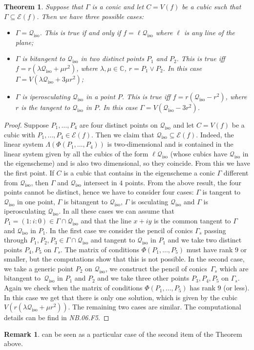 \documentclass[a4paper, 11pt, reqno]{amsart}
\theoremstyle{plain}
\newtheorem{theorem}[lemma]{Theorem}
\theoremstyle{definition}
\newtheorem{rmk}[lemma]{Remark}
\newcommand{\nb}[2]{\textsl{{NB}.{#1}.{#2}}}
\newcommand{\iso}{\mathcal{Q}_{\mathrm{iso}}}
\newcommand{\Eig}[1]{\mathcal{E}\!\left( {#1} \right)}
\begin{document}
\begin{theorem} Suppose that $\Gamma$ is a conic and let $C=V(f)$ be a cubic such that $\Gamma \subseteq \Eig{f}$. Then we have three possible cases:
    \begin{itemize}
        \item $\Gamma = \iso$. This is true if and only if $f = \ell\iso$ where $\ell$ is any line of the plane;
        \item $\Gamma$ is bitangent to $\iso$ in two distinct points $P_1$ and $P_2$. This is true iff $f = r(\lambda \iso+ \mu r^2)$, where $\lambda, \mu \in \mathbb{C}$, $r = P_1 \vee P_2$. In this case $\Gamma = V(\lambda \iso+3 \mu r^2)$;
        \item $\Gamma$ is iperosculating $\iso$ in a point $P$. This is true iff $f = r(\iso-r^2)$, where $r$ is the tangent to $\iso$ in $P$. In this case 
        $\Gamma = V(\iso-3r^2)$.
    \end{itemize}
\end{theorem}
\begin{proof} Suppose $P_1, \dots, P_4$ are four distinct points on $\iso$ and let $C=V(f)$ be a cubic with $P_1, \dots, P_4\in \Eig{f}$. Then we claim that
$\iso\subseteq \Eig{f}$. Indeed, the linear system $\Lambda(\Phi(P_1, \dotsc, P_4))$ is two-dimensional and is contained in the linear system given by all the cubics of the form $\ell \iso$ (whose cubics have $\iso$ in the eigenscheme) and is also two dimensional, so they coincide. From this we have the first point. If $C$ is a cubic that contains in the eigenscheme a conic $\Gamma$ different from $\iso$, then $\Gamma$ and $\iso$ intersect in $4$ points. From the above result, the four points cannot be distinct, hence we have to consider four cases: $\Gamma$ is tangent to $\iso$ in one point, $\Gamma$ is bitangent to
$\iso$, $\Gamma$ is osculating $\iso$ and $\Gamma$ is iperosculating $\iso$. In all these cases we can assume that 
$P_1 = (1: i: 0) \in \Gamma \cap \iso$ and that
the line $x+iy$ is the common tangent to $\Gamma$ and $\iso$ in $P_1$. 
In the first case we consider the pencil of conics $\Gamma_s$ passing through $P_1, P_2, P_3\in \Gamma \cap \iso$ and tangent to $\iso$ in $P_1$ and 
we take two distinct points $P_4, P_5$ on $\Gamma_s$. The matrix of conditions 
$\Phi(P_1, \dotsc, P_5)$ must have rank $9$ or smaller, but the computations show that 
this is not possible. In the second case, we take a generic point $P_2$ on $\iso$, we construct 
the pencil of conics~$\Gamma_s$ which are bitangent to~$\iso$ in $P_1$ and $P_2$ and we take three other points $P_3, P_4, P_5$ 
on $\Gamma_s$. Again we check when the matrix of conditions $\Phi(P_1, \dotsc, P_5)$ has rank $9$ (or less). In this case we get that there is only one solution, which is given by the cubic 
$V(r(\lambda \iso+\mu r^2))$. The remaining two cases are similar. The computational details can be find in \nb{06}{F5}.
\end{proof}
\begin{rmk}
     can be seen as a particular case of the second item of the Theorem above.
\end{rmk}
\end{document}
